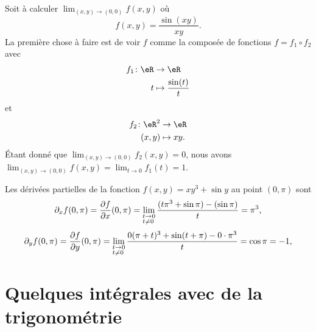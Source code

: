 \begin{example}
	Soit à calculer \( \lim_{(x,y)\to(0,0)}f(x,y)\) où
	\begin{equation}
		f(x,y)=\frac{ \sin(xy) }{ xy }.
	\end{equation}
	La première chose à faire est de voir \( f\) comme la composée de fonctions \( f=f_1\circ f_2\) avec
	\begin{equation}
		\begin{aligned}
			f_1\colon \eR & \to \eR                       \\
			t             & \mapsto \frac{ \sin(t) }{ t }
		\end{aligned}
	\end{equation}
	et
	\begin{equation}
		\begin{aligned}
			f_2\colon \eR^2 & \to \eR     \\
			(x,y)           & \mapsto xy.
		\end{aligned}
	\end{equation}
	Étant donné que \( \lim_{(x,y)\to(0,0)}f_2(x,y)=0\), nous avons \( \lim_{(x,y)\to(0,0)}f(x,y)=\lim_{t\to 0} f_1(t)=1\).
\end{example}

\begin{example}     \label{EXooETZYooYsKPDJ}
	Les dérivées partielles de la fonction \( f(x,y)=xy^3+\sin y\) au point \( (0,\pi)\) sont
	\[
		\partial_xf(0,\pi)=\frac{ \partial f }{ \partial x }(0,\pi)=\lim_{\begin{subarray}{l}
				t\to 0\\ t\neq 0
			\end{subarray}} \frac{(t\pi^3+\sin \pi)-(\sin \pi)}{t}= \pi^3,
	\]
	\[
		\partial_yf(0,\pi)=\frac{ \partial f }{ \partial y }(0,\pi)=\lim_{\begin{subarray}{l}
				t\to 0\\ t\neq 0
			\end{subarray}} \frac{0(\pi+t)^3+\sin (t+\pi)-0\cdot \pi^3}{t}= \cos \pi=-1,
	\]
\end{example}

\section{Quelques intégrales avec de la trigonométrie}
\label{SECooOOPPooZLbaEH}

